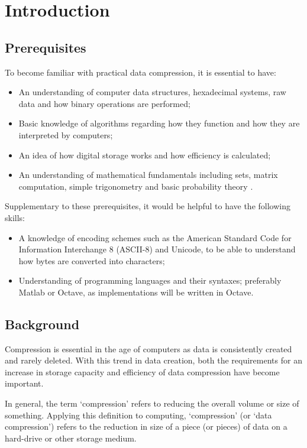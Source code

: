 \documentclass[12pt]{article}
\begin{document}
\section{Introduction}
\subsection{Prerequisites}
To become familiar with practical data compression, it is essential to have:

\begin{itemize}
	\item An understanding of computer data structures, hexadecimal systems, raw data and how binary operations are performed;
	\item Basic knowledge of algorithms regarding how they function and how they are interpreted by computers;
	\item An idea of how digital storage works and how efficiency is calculated;
	\item An understanding of mathematical fundamentals including sets, matrix computation, simple trigonometry and basic probability theory \citep{ipu_dc}.
\end{itemize}

\begin{flushleft}
	Supplementary to these prerequisites, it would be helpful to have the following skills:
\end{flushleft}

\begin{itemize}
	\item A knowledge of encoding schemes such as the American Standard Code for Information Interchange 8 (ASCII-8) and Unicode, to be able to understand how bytes are converted into characters;
	\item Understanding of programming languages and their syntaxes; preferably Matlab or Octave, as implementations will be written in Octave.
\end{itemize}

\subsection{Background}
Compression is essential in the age of computers as data is consistently created and rarely deleted. With this trend in data creation, both the requirements for an increase in storage capacity and efficiency of data compression have become important.

In general, the term `compression' refers to reducing the overall volume or size of something. Applying this definition to computing, `compression' (or `data compression') refers to the reduction in size of a piece (or pieces) of data on a hard-drive or other storage medium.
\end{document}
